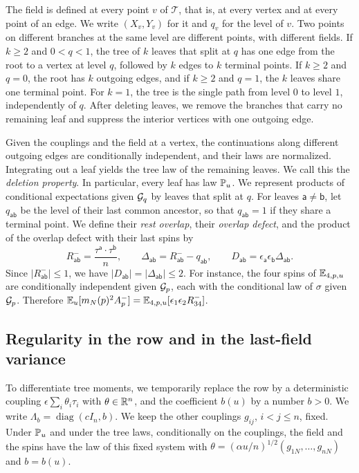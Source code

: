 The field is defined at every point $v$ of $\mathcal T$, that is, at every
vertex and at every point of an edge. We write $(X_v,Y_v)$ for it and
$q_v$ for the level of $v$. Two points on different branches at the same
level are different points, with different fields. If $k\ge2$ and
$0<q<1$, the tree of $k$ leaves that split at $q$ has one edge from the
root to a vertex at level $q$, followed by $k$ edges to $k$ terminal
points. If $k\ge2$ and $q=0$, the root has $k$ outgoing edges, and if
$k\ge2$ and $q=1$, the $k$ leaves share one terminal point. For $k=1$,
the tree is the single path from level $0$ to level $1$, independently of
$q$. After deleting leaves, we remove the branches that carry no
remaining leaf and suppress the interior vertices with one outgoing edge.

Given the couplings and the field at a vertex, the continuations along
different outgoing edges are conditionally independent, and their laws are
normalized. Integrating out a leaf yields the tree law of the
remaining leaves. We call this the \emph{deletion property}. In
particular, every leaf has law $\mathbb P_u$. We represent products of conditional
expectations given $\mathcal G_q$ by leaves that split at $q$.
For leaves $\mathsf a\ne\mathsf b$, let $q_{\mathsf{ab}}$ be the level of
their last common ancestor, so that $q_{\mathsf{ab}}=1$ if they share a
terminal point. We define their \emph{rest overlap}, their \emph{overlap
defect}, and the product of the overlap defect with their last spins by
\begin{equation}\label{eq:defectdefinition}
 R^-_{\mathsf{ab}}=\frac{\tau^{\mathsf a}\cdot\tau^{\mathsf b}}{n},\qquad
 \Delta_{\mathsf{ab}}=R^-_{\mathsf{ab}}-q_{\mathsf{ab}},\qquad
 D_{\mathsf{ab}}=\epsilon_{\mathsf a}\epsilon_{\mathsf b}
                          \Delta_{\mathsf{ab}}.
\end{equation}
Since $|R^-_{\mathsf{ab}}|\le1$, we have
$|D_{\mathsf{ab}}|=|\Delta_{\mathsf{ab}}|\le2$. For instance, the four
spins of $\mathbb E_{4,p,u}$ are conditionally independent given $\mathcal G_p$, each
with the conditional law of $\sigma$ given $\mathcal G_p$. Therefore
$\mathbb E_u[m_N(p)^2A_p^-]=\mathbb E_{4,p,u}[\epsilon_1\epsilon_2R^-_{34}]$.

\subsection{Regularity in the row and in the last-field variance}

To differentiate tree moments, we temporarily replace the row by a
deterministic coupling $\epsilon\sum_i\theta_i\tau_i$ with
$\theta\in\mathbb R^n$, and the coefficient $b(u)$ by a number $b>0$. We write
$\Lambda_b=\operatorname{diag}(cI_n,b)$. We keep the other couplings $g_{ij}$,
$i<j\le n$, fixed. Under $\mathbb P_u$ and under the tree laws,
conditionally on the couplings, the field and the spins have the law of
this fixed system with $\theta=(\alpha u/n)^{1/2}(g_{1N},\ldots,g_{nN})$
and $b=b(u)$.

